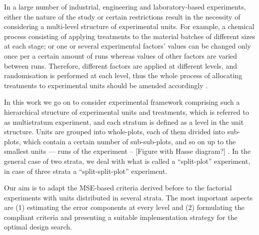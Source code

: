 
In a large number of industrial, engineering and laboratory-based experiments, either the nature of the study or certain restrictions result in the necessity of considering a multi-level structure of experimental units. For example, a chemical process consisting of applying treatments to the material batches of different sizes at each stage;  or one or several experimental factors' values can be changed only once per a certain amount of runs whereas values of other factors are varied between runs. Therefore, different factors are applied at different levels, and randomisation is performed at each level, thus the whole process of allocating treatments to experimental units should be amended accordingly \citep{MeadGilmour2012}.

In this work we go on to consider experimental framework comprising such a hierarchical structure of experimental units and treatments, which is referred to as multistratum experiment, and each stratum is defined as a level in the unit structure. Units are grouped into whole-plots, each of them divided into sub-plots, which contain a certain number of sub-sub-plots, and so on up to the smallest units --- runs of the experiment -- [Figure with Hasse diagram?] . In the general case of two strata, we deal with what is called a ``split-plot'' experiment, in case of three strata a ``split-split-plot'' experiment. 

Our aim is to adapt the MSE-based criteria derived before to the factorial experiments with units distributed in several strata. The most important aspects are (1) estimating the error components at every level and (2) formulating the compliant criteria and presenting a suitable implementation strategy for the optimal design search.

